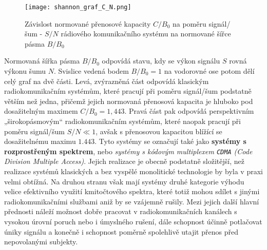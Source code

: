       \begin{figure}[ht!]  %
        \centering
        \texttt{[image: shannon\_graf\_C\_N.png]}
        \caption{Závislost normované přenosové kapacity \(C/B_0\) na poměru signál/šum - \(S/N\)  
                 rádiového komunikačního systému na normované šířce pásma \(B/B_0\)
                  \cite[s.~79]{ZaludRA}}
        \label{fig_RA:modulace02}
      \end{figure} 
      
      Normovaná šířka pásma \(B/B_0\) odpovídá stavu, kdy se výkon signálu \(S\) rovná výkonu šumu 
      \(N\). Svislice vedená bodem \(B/B_0 = 1\) na vodorovné ose potom dělí celý graf na dvě 
      části. Levá, zvýrazněná část odpovídá klasickým radiokomunikačním systémům, které pracují při 
      poměru signál/šum podstatně větším než jedna, přičemž jejich normovaná přenosová kapacita je 
      hluboko pod dosažitelným maximem \(C/B_0 = 1,443\). Pravá část pak odpovídá perspektivním 
      „širokopásmovým“ radiokomunikačním systémům, které naopak pracují při poměru signál/šum \( 
      S/N\ll1\), avšak s přenosovou kapacitou blížící se dosažitelnému maximu \(\num{1.443}\). Tyto 
      systémy se označují také jako \textbf{systémy s rozprostřeným spektrem}, nebo \emph{systémy s 
      kódovým multiplexem \texttt{CDMA} (Code Division Multiple Access)}. Jejich realizace je 
      obecně podstatně složitější, než realizace systémů klasických a bez vyspělé monolitické 
      technologie by byla v praxi velmi obtížná. Na druhou stranu však mají systémy druhé kategorie 
      výhodu velice efektivního využití kmitočtového spektra, které totiž mohou sdílet s jinými 
      radiokomunikačními službami aniž by se vzájemně rušily. Mezi jejich další hlavní přednosti 
      náleží možnost dobře pracovat v radiokomunikačních kanálech s vysokou úrovní poruch nebo i 
      úmyslného rušení, dále schopnost účinně potlačovat úniky signálu a konečně i schopnost 
      poměrně spolehlivě utajit přenos před nepovolanými subjekty.\cite[s.~78]{ZaludRA}
     
      

